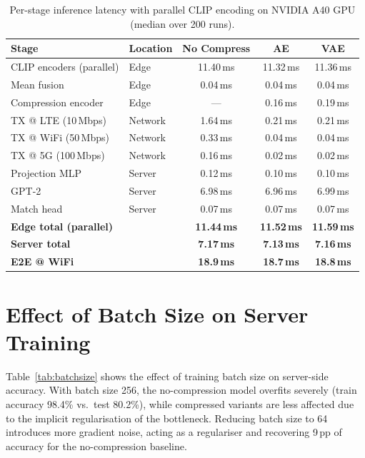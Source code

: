 \begin{table}[h]
\centering
\caption{Per-stage inference latency with parallel CLIP encoding on NVIDIA A40 GPU (median over 200 runs).}
\label{tab:latency_parallel}
\begin{tabular}{llccc}
\toprule
\textbf{Stage} & \textbf{Location} & \textbf{No Compress} & \textbf{AE} & \textbf{VAE} \\
\midrule
CLIP encoders (parallel) & Edge    & 11.40\,ms & 11.32\,ms & 11.36\,ms \\
Mean fusion              & Edge    & 0.04\,ms  & 0.04\,ms  & 0.04\,ms  \\
Compression encoder      & Edge    & —         & 0.16\,ms  & 0.19\,ms  \\
\midrule
TX @ LTE (10\,Mbps)      & Network & 1.64\,ms  & 0.21\,ms  & 0.21\,ms  \\
TX @ WiFi (50\,Mbps)     & Network & 0.33\,ms  & 0.04\,ms  & 0.04\,ms  \\
TX @ 5G (100\,Mbps)      & Network & 0.16\,ms  & 0.02\,ms  & 0.02\,ms  \\
\midrule
Projection MLP           & Server  & 0.12\,ms  & 0.10\,ms  & 0.10\,ms  \\
GPT-2                    & Server  & 6.98\,ms  & 6.96\,ms  & 6.99\,ms  \\
Match head               & Server  & 0.07\,ms  & 0.07\,ms  & 0.07\,ms  \\
\midrule
\textbf{Edge total (parallel)} & & \textbf{11.44\,ms} & \textbf{11.52\,ms} & \textbf{11.59\,ms} \\
\textbf{Server total}          & & \textbf{7.17\,ms}  & \textbf{7.13\,ms}  & \textbf{7.16\,ms}  \\
\textbf{E2E @ WiFi}            & & \textbf{18.9\,ms}  & \textbf{18.7\,ms}  & \textbf{18.8\,ms}  \\
\bottomrule
\end{tabular}
\end{table}

\section{Effect of Batch Size on Server Training}
\label{app:batchsize}

Table~\ref{tab:batchsize} shows the effect of training batch size on server-side accuracy. With batch size 256, the no-compression model overfits severely (train accuracy 98.4\% vs.\ test 80.2\%), while compressed variants are less affected due to the implicit regularisation of the bottleneck. Reducing batch size to 64 introduces more gradient noise, acting as a regulariser and recovering 9\,pp of accuracy for the no-compression baseline.


